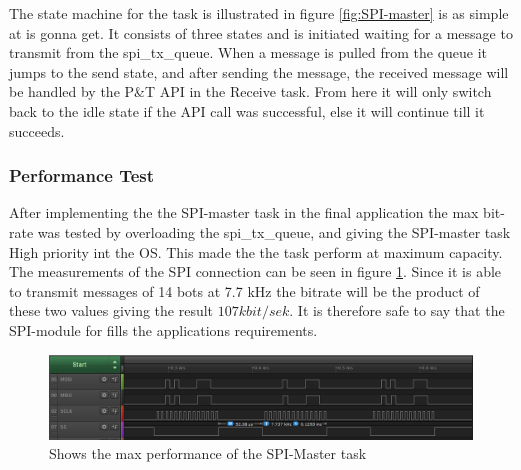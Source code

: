 The state machine for the task is illustrated in figure \ref{fig:SPI-master} is as simple at is gonna get. It consists of three states and is initiated waiting for a message to transmit from the spi\_tx\_queue. When a message is pulled from the queue it jumps to the send state, and after sending the message, the received message will be handled by the P\&T API in the Receive task. From here it will only switch back to the idle state if the API call was successful, else it will continue till it succeeds. 


\subsubsection{Performance Test} 
\label{sec:PerformanceTest}
After implementing the the SPI-master task in the final application the max bit-rate was tested by overloading the spi\_tx\_queue, and giving the SPI-master task High priority int the OS. This made the the task perform at maximum capacity. The measurements of the SPI connection can be seen in figure \ref{fig:HightPerformance}. Since it is able to transmit messages of 14 bots at 7.7 kHz the bitrate will be the product of these two values giving the result $107 kbit/sek$. It is therefore safe to say that the SPI-module for fills the applications requirements. 


\begin{figure}
	\centering
	\includegraphics[scale = 0.7] {Billeder/HightPerformance}
	\caption{Shows the max performance of the SPI-Master task}
	\label{fig:HightPerformance}
\end{figure}
 

 



